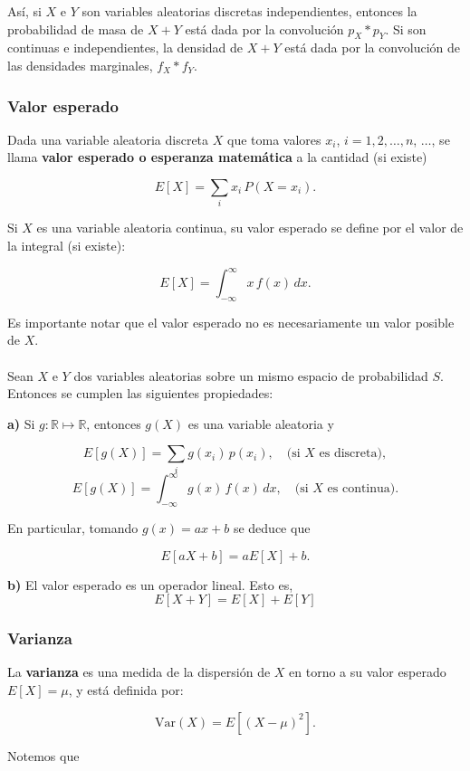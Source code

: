 \documentclass[11pt, a4paper]{article}
\theoremstyle{definition}
\begin{document}
Así, si \(X\) e \(Y\) son variables aleatorias discretas independientes, entonces la probabilidad de masa de \(X+Y\) está dada por la convolución \(p_{X}*p_{Y}\). Si son continuas e independientes, la densidad de \(X+Y\) está dada por la convolución de las densidades marginales, \(f_{X}*f_{Y}\).

\subsubsection{Valor esperado}
Dada una variable aleatoria discreta \(X\) que toma valores \(x_{i}\), \(i=1,2,\ldots,n\), \(\ldots\), se llama \textbf{valor esperado o esperanza matemática} a la cantidad (si existe)

\[E[X]=\sum_{i}x_{i}\,P(X=x_{i}).\]

Si \(X\) es una variable aleatoria continua, su valor esperado se define por el valor de la integral (si existe):

\[E[X]=\int_{-\infty}^{\infty}x\,f(x)\,dx.\]

Es importante notar que el valor esperado no es necesariamente un valor posible de \(X\).
\\ \\

Sean \(X\) e \(Y\) dos variables aleatorias sobre un mismo espacio de probabilidad \(S\). Entonces se cumplen las siguientes propiedades:

\noindent
\textbf{a)} Si \(g:\mathbb{R}\mapsto\mathbb{R}\), entonces \(g(X)\) es una variable aleatoria y

\[E[g(X)] = \sum_{i}g(x_{i})\,p(x_{i}), \quad \text{(si $X$ es discreta)},\]
\[E[g(X)] = \int_{-\infty}^{\infty}g(x)\,f(x)\,dx, \quad \text{(si $X$ es continua)}.\]

En particular, tomando \(g(x)=ax+b\) se deduce que

\[E[aX+b]=aE[X]+b.\]

\noindent
\textbf{b)} El valor esperado es un operador lineal. Esto es,
\[
E[X+Y] = E[X] + E[Y]
\]

\subsubsection{Varianza}
La \textbf{varianza} es una medida de la dispersión de \( X \) en torno a su valor esperado \( E[X] = \mu \), y está definida por:

\[\text{Var}(X) = E[(X - \mu)^2].\]

Notemos que
\end{document}
